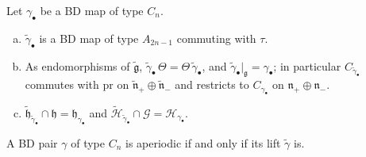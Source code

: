 \documentclass[a4paper]{amsart}
\numberwithin{equation}{section}
\theoremstyle{definition}
\theoremstyle{remark}
\newcommand{\mfh}{\mathfrak{h}}
\newcommand{\mfg}{\mathfrak{g}}
\newcommand{\mfn}{\mathfrak{n}}
\newcommand{\mcG}{\mathcal{G}}
\newcommand{\mcH}{\mathcal{H}}
\newcommand{\tg}{\widetilde{\gamma}}
\newcommand{\Vt}{\Theta}
\newcommand{\pr}{\mathrm{pr}}
\begin{document}
\begin{proposition}
  \label{prop: lift}
  Let $\gamma_\bullet$ be a BD map of type $C_n$.
  \begin{enumerate}[(a)]
    \item $\tg_\bullet$ is a BD map of type $A_{2n-1}$ commuting with $\tau$.
    \item As endomorphisms of $\widetilde{\mfg}$, $\tg_\bullet\,\Vt=\Vt\,\tg_\bullet$, and $\tg_\bullet|_\mfg=\gamma_\bullet$; in particular $C_{\tg_\bullet}$ commutes with $\pr$ on $\widetilde{\mfn}_+\oplus\widetilde{\mfn}_-$ and restricts to $C_{\gamma_\bullet}$ on $\mfn_+\oplus\mfn_-$.
    \item $\widetilde{\mfh}_{\tg_\bullet}\cap\mfh=\mfh_{\gamma_\bullet}$ and $\widetilde{\mcH}_{\tg_\bullet}\cap\mcG=\mcH_{\gamma_\bullet}$.
  \end{enumerate}
  A BD pair $\gamma$ of type $C_n$ is aperiodic if and only if its lift $\tg$ is.
\end{proposition}
\end{document}
